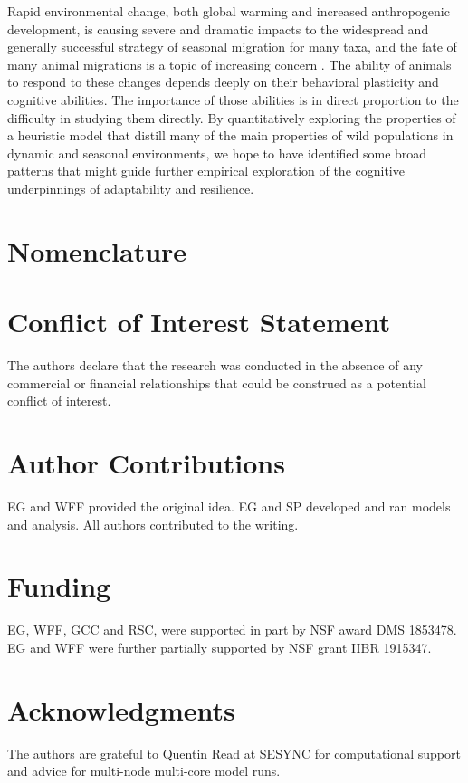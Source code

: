 \documentclass[utf8]{frontiersSCNS} %
\begin{document}
Rapid environmental change, both global warming and increased anthropogenic development, is causing severe and dramatic impacts to the widespread and generally successful strategy of seasonal migration for many taxa, and the fate of many animal migrations is a topic of increasing concern \citep{Kauffman2021, Wilcove2008}. The ability of animals to respond to these changes depends deeply on their behavioral plasticity and cognitive abilities. The importance of those abilities is in direct proportion to the difficulty in studying them directly. By quantitatively exploring the properties of a heuristic model that distill many of the main properties of wild populations in dynamic and seasonal environments, we hope to have identified some broad patterns that might guide further empirical exploration of the cognitive underpinnings of adaptability and resilience.


\section{Nomenclature}


\section*{Conflict of Interest Statement}

The authors declare that the research was conducted in the absence of any commercial or financial relationships that could be construed as a potential conflict of interest.

\section*{Author Contributions}

EG and WFF provided the original idea. EG and SP developed and ran models and analysis. All authors contributed to the writing. 

\section*{Funding}

EG, WFF, GCC and RSC, were supported in part by NSF award DMS 1853478. EG and WFF were further partially supported by NSF grant IIBR 1915347. 

\section*{Acknowledgments}
The authors are grateful to Quentin Read at SESYNC for computational support and advice for multi-node multi-core model runs. 
\end{document}
